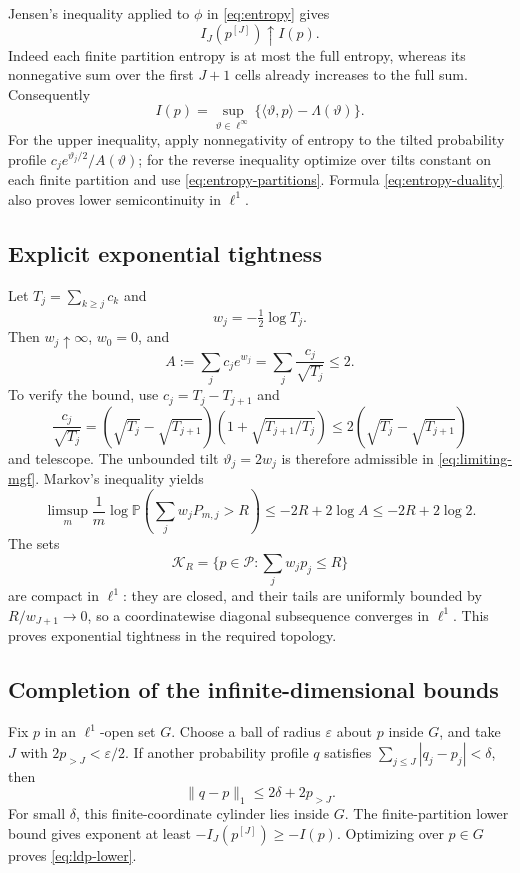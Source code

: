 \documentclass[11pt,a4paper]{article}
\numberwithin{equation}{section}
\theoremstyle{definition}
\theoremstyle{remark}
\newcommand{\PP}{\mathbb P}
\newcommand{\simplex}{\mathcal P}
\begin{document}
Jensen's inequality applied to $\phi$ in \cref{eq:entropy} gives
\begin{equation}
I_J(p^{[J]})\uparrow I(p).
\label{eq:entropy-partitions}
\end{equation}
Indeed each finite partition entropy is at most the full entropy, whereas
its nonnegative sum over the first $J+1$ cells already increases to the
full sum. Consequently
\begin{equation}
I(p)=\sup_{\vartheta\in\ell^\infty}
 \{\langle\vartheta,p\rangle-\Lambda(\vartheta)\}.
\label{eq:entropy-duality}
\end{equation}
For the upper inequality, apply nonnegativity of entropy to the tilted
probability profile $c_je^{\vartheta_j/2}/A(\vartheta)$; for the reverse
inequality optimize over tilts constant on each finite partition and use
\cref{eq:entropy-partitions}. Formula \cref{eq:entropy-duality}
also proves lower semicontinuity in $\ell^1$.

\subsection{Explicit exponential tightness}
Let $T_j=\sum_{k\ge j}c_k$ and
\begin{equation}
w_j=-\tfrac12\log T_j.
\label{eq:coercive-weights}
\end{equation}
Then $w_j\uparrow\infty$, $w_0=0$, and
\begin{equation}
A:=\sum_jc_je^{w_j}=\sum_j\frac{c_j}{\sqrt{T_j}}\le2.
\label{eq:coercive-bound}
\end{equation}
To verify the bound, use $c_j=T_j-T_{j+1}$ and
\[
\frac{c_j}{\sqrt{T_j}}
=(\sqrt{T_j}-\sqrt{T_{j+1}})
 \left(1+\sqrt{T_{j+1}/T_j}\right)
\le2(\sqrt{T_j}-\sqrt{T_{j+1}})
\]
and telescope. The unbounded tilt $\vartheta_j=2w_j$ is therefore
admissible in \cref{eq:limiting-mgf}. Markov's inequality yields
\begin{equation}
\limsup_m\frac1m\log\PP\left(\sum_jw_jP_{m,j}>R\right)
\le-2R+2\log A\le-2R+2\log2.
\label{eq:exp-tightness}
\end{equation}
The sets
\[
\mathcal K_R=\{p\in\simplex:\sum_jw_jp_j\le R\}
\]
are compact in $\ell^1$: they are closed, and their tails are uniformly
bounded by $R/w_{J+1}\to0$, so a coordinatewise diagonal subsequence
converges in $\ell^1$. This proves exponential tightness in the required
topology.

\subsection{Completion of the infinite-dimensional bounds}
Fix $p$ in an $\ell^1$-open set $G$. Choose a ball of radius
$\varepsilon$ about $p$ inside $G$, and take $J$ with
$2p_{>J}<\varepsilon/2$. If another probability profile $q$ satisfies
$\sum_{j\le J}|q_j-p_j|<\delta$, then
\[
\|q-p\|_1\le2\delta+2p_{>J}.
\]
For small $\delta$, this finite-coordinate cylinder lies inside $G$.
The finite-partition lower bound gives exponent at least
$-I_J(p^{[J]})\ge-I(p)$. Optimizing over $p\in G$ proves
\cref{eq:ldp-lower}.
\end{document}
